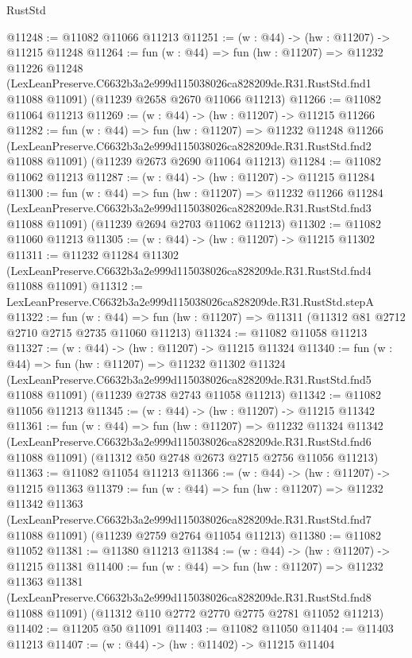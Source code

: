 \begin{lexlean}{RustStd}
\begin{coremodule}
@11248 := @11082 @11066 @11213
@11251 := (w : @44) -> (hw : @11207) -> @11215 @11248
@11264 := fun (w : @44) =>
  fun (hw : @11207) =>
  @11232
    @11226
    @11248
    (LexLeanPreserve.C6632b3a2e999d115038026ca828209de.R31.RustStd.fnd1 @11088 @11091)
    (@11239 @2658 @2670 @11066 @11213)
@11266 := @11082 @11064 @11213
@11269 := (w : @44) -> (hw : @11207) -> @11215 @11266
@11282 := fun (w : @44) =>
  fun (hw : @11207) =>
  @11232
    @11248
    @11266
    (LexLeanPreserve.C6632b3a2e999d115038026ca828209de.R31.RustStd.fnd2 @11088 @11091)
    (@11239 @2673 @2690 @11064 @11213)
@11284 := @11082 @11062 @11213
@11287 := (w : @44) -> (hw : @11207) -> @11215 @11284
@11300 := fun (w : @44) =>
  fun (hw : @11207) =>
  @11232
    @11266
    @11284
    (LexLeanPreserve.C6632b3a2e999d115038026ca828209de.R31.RustStd.fnd3 @11088 @11091)
    (@11239 @2694 @2703 @11062 @11213)
@11302 := @11082 @11060 @11213
@11305 := (w : @44) -> (hw : @11207) -> @11215 @11302
@11311 := @11232
    @11284
    @11302
    (LexLeanPreserve.C6632b3a2e999d115038026ca828209de.R31.RustStd.fnd4 @11088 @11091)
@11312 := LexLeanPreserve.C6632b3a2e999d115038026ca828209de.R31.RustStd.stepA
@11322 := fun (w : @44) =>
  fun (hw : @11207) => @11311 (@11312 @81 @2712 @2710 @2715 @2735 @11060 @11213)
@11324 := @11082 @11058 @11213
@11327 := (w : @44) -> (hw : @11207) -> @11215 @11324
@11340 := fun (w : @44) =>
  fun (hw : @11207) =>
  @11232
    @11302
    @11324
    (LexLeanPreserve.C6632b3a2e999d115038026ca828209de.R31.RustStd.fnd5 @11088 @11091)
    (@11239 @2738 @2743 @11058 @11213)
@11342 := @11082 @11056 @11213
@11345 := (w : @44) -> (hw : @11207) -> @11215 @11342
@11361 := fun (w : @44) =>
  fun (hw : @11207) =>
  @11232
    @11324
    @11342
    (LexLeanPreserve.C6632b3a2e999d115038026ca828209de.R31.RustStd.fnd6 @11088 @11091)
    (@11312 @50 @2748 @2673 @2715 @2756 @11056 @11213)
@11363 := @11082 @11054 @11213
@11366 := (w : @44) -> (hw : @11207) -> @11215 @11363
@11379 := fun (w : @44) =>
  fun (hw : @11207) =>
  @11232
    @11342
    @11363
    (LexLeanPreserve.C6632b3a2e999d115038026ca828209de.R31.RustStd.fnd7 @11088 @11091)
    (@11239 @2759 @2764 @11054 @11213)
@11380 := @11082 @11052
@11381 := @11380 @11213
@11384 := (w : @44) -> (hw : @11207) -> @11215 @11381
@11400 := fun (w : @44) =>
  fun (hw : @11207) =>
  @11232
    @11363
    @11381
    (LexLeanPreserve.C6632b3a2e999d115038026ca828209de.R31.RustStd.fnd8 @11088 @11091)
    (@11312 @110 @2772 @2770 @2775 @2781 @11052 @11213)
@11402 := @11205 @50 @11091
@11403 := @11082 @11050
@11404 := @11403 @11213
@11407 := (w : @44) -> (hw : @11402) -> @11215 @11404

\end{coremodule}
\end{lexlean}

